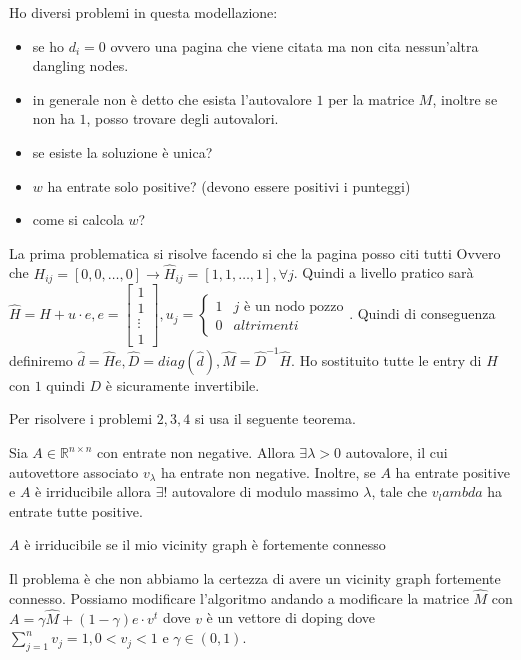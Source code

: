 Ho diversi problemi in questa modellazione:
\begin{itemize}
    \item se ho $d_i=0$ ovvero una pagina che viene citata ma non cita nessun'altra dangling nodes.
    \item in generale non è detto che esista l'autovalore $1$ per la matrice $M$,
    inoltre se non ha $1$, posso trovare degli autovalori.
    \item se esiste la soluzione è unica?
    \item $w$ ha entrate solo positive? (devono essere positivi i punteggi)
    \item come si calcola $w$?
\end{itemize}
La prima problematica si risolve facendo si che la pagina posso citi tutti Ovvero
che $H_{ij} = \left[0,0,\dots, 0\right] \rightarrow \hat{H}_{ij} =\left[1,1,\dots, 1\right], \forall j$.
Quindi a livello pratico sarà $\hat{H} =H + u \cdot e, e= \left[\begin{array}{c}
    1\\1\\\vdots\\1
\end{array}\right], u_j= \begin{cases}
    1 & j \text{ è un nodo pozzo}\\
    0& altrimenti
\end{cases}$.
Quindi di conseguenza definiremo $\hat{d} = \hat{H}e, \hat{D}=diag(\hat{d}), \hat{M}  =\hat{D}^{-1}\hat{H}$.
Ho sostituito tutte le entry di $H$ con $1$ quindi $D$ è sicuramente invertibile.

Per risolvere i problemi $2,3,4$ si usa il seguente teorema.

\begin{teorema} 
    Sia $A\in \mathbb{R}^{n\times n}$ con entrate non negative. Allora $\exists \lambda>0$
    autovalore, il cui autovettore associato $v_\lambda$ ha entrate non negative. 
    Inoltre, se $A$ ha entrate positive e $A$ è irriducibile allora 
    $\exists !$ autovalore di modulo massimo $\lambda$, tale che $v_lambda$ ha entrate 
    tutte positive.
\end{teorema}

\begin{definizione}
    $A$ è irriducibile se il mio vicinity graph è fortemente connesso
\end{definizione}
Il problema è che non abbiamo la certezza di avere un vicinity graph fortemente 
connesso. Possiamo modificare l'algoritmo  andando a modificare la matrice $\hat{M}$
con $A= \gamma \hat{M}+ (1-\gamma) e \cdot v^t$ dove $v$ è un vettore di doping 
dove $\sum_{j=1}^n v_j = 1, 0<v_j <1$ e $\gamma \in (0,1)$.


